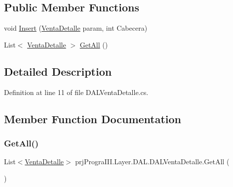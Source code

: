 \subsection*{Public Member Functions}
\begin{DoxyCompactItemize}
\item 
void \hyperlink{classprj_progra_i_i_i_1_1_layer_1_1_d_a_l_1_1_d_a_l_venta_detalle_a369ae96a2e9f4a1f15ba28f5a19ab366}{Insert} (\hyperlink{classprj_progra_i_i_i_1_1_layer_1_1_entities_1_1_venta_detalle}{Venta\+Detalle} param, int Cabecera)
\item 
List$<$ \hyperlink{classprj_progra_i_i_i_1_1_layer_1_1_entities_1_1_venta_detalle}{Venta\+Detalle} $>$ \hyperlink{classprj_progra_i_i_i_1_1_layer_1_1_d_a_l_1_1_d_a_l_venta_detalle_ae8473568c2fc6a75b57018056e29f39a}{Get\+All} ()
\end{DoxyCompactItemize}


\subsection{Detailed Description}


Definition at line 11 of file D\+A\+L\+Venta\+Detalle.\+cs.



\subsection{Member Function Documentation}
\hypertarget{classprj_progra_i_i_i_1_1_layer_1_1_d_a_l_1_1_d_a_l_venta_detalle_ae8473568c2fc6a75b57018056e29f39a}{}\label{classprj_progra_i_i_i_1_1_layer_1_1_d_a_l_1_1_d_a_l_venta_detalle_ae8473568c2fc6a75b57018056e29f39a} 
\subsubsection{\texorpdfstring{Get\+All()}{GetAll()}}
{\footnotesize\ttfamily List$<$\hyperlink{classprj_progra_i_i_i_1_1_layer_1_1_entities_1_1_venta_detalle}{Venta\+Detalle}$>$ prj\+Progra\+I\+I\+I.\+Layer.\+D\+A\+L.\+D\+A\+L\+Venta\+Detalle.\+Get\+All (\begin{DoxyParamCaption}{ }\end{DoxyParamCaption})}




